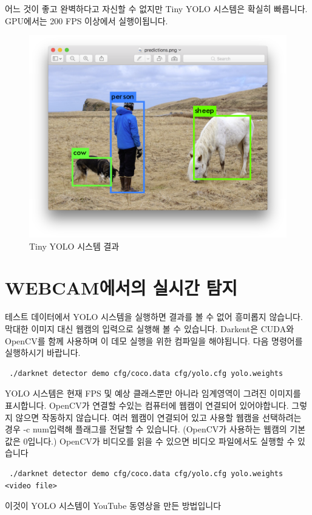 \documentclass{article}
\begin{document}
어느 것이 좋고 완벽하다고 자신할 수 없지만 Tiny YOLO 시스템은 확실히 빠릅니다. 
GPU에서는 200 FPS 이상에서 실행이됩니다.
\begin{figure}[h!]
\centering
\includegraphics[scale=0.15]{tinyyolo.png}
\caption{Tiny YOLO 시스템 결과}
\label{fig:tinyimg}
\end{figure}

\section{WEBCAM에서의 실시간 탐지}

테스트 데이터에서 YOLO 시스템을 실행하면 결과를 볼 수 없어 흥미롭지 않습니다. 
막대한 이미지 대신 웹캠의 입력으로 실행해 볼 수 있습니다.
Darkent은 CUDA와 OpenCV를 함께 사용하며 이 데모 실행을 위한 컴파일을 해야됩니다. 
다음 명령어를 실행하시기 바랍니다.
\begin{lstlisting}
 ./darknet detector demo cfg/coco.data cfg/yolo.cfg yolo.weights  
\end{lstlisting}
YOLO 시스템은 현재 FPS 및 예상 클래스뿐만 아니라 임계영역이 그려진 이미지를 표시합니다.
OpenCV가 연결할 수있는 컴퓨터에 웹캠이 연결되어 있어야합니다. 그렇지 않으면 작동하지 않습니다. 
여러 웹캠이 연결되어 있고 사용할 웹캠을 선택하려는 경우 -c \textlangle num\textrangle 입력해 플래그를 전달할 수 있습니다. 
(OpenCV가 사용하는 웹캠의 기본값은 0입니다.) OpenCV가 비디오를 읽을 수 있으면 비디오 파일에서도 실행할 수 있습니다

\begin{lstlisting}
 ./darknet detector demo cfg/coco.data cfg/yolo.cfg yolo.weights <video file> 
\end{lstlisting}
이것이 YOLO 시스템이 YouTube 동영상을 만든 방법입니다
\end{document}

